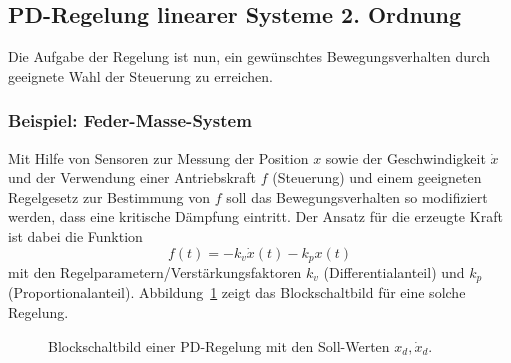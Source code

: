 		\subsection{PD-Regelung linearer Systeme 2. Ordnung} %
			Die Aufgabe der Regelung ist nun, ein gewünschtes Bewegungsverhalten durch geeignete Wahl der Steuerung zu erreichen.

			\subsubsection{Beispiel: Feder-Masse-System} %
				Mit Hilfe von Sensoren zur Messung der Position \( x \) sowie der Geschwindigkeit \( \dot{x} \) und der Verwendung einer Antriebskraft \(f\) (Steuerung) und einem geeigneten Regelgesetz zur Bestimmung von \(f\) soll das Bewegungsverhalten so modifiziert werden, dass eine kritische Dämpfung eintritt. Der Ansatz für die erzeugte Kraft ist dabei die Funktion
				\begin{equation*}
					f(t) = -k_v \dot{x}(t) - k_p x(t)
				\end{equation*}
				mit den Regelparametern/Verstärkungsfaktoren \( k_v \) (Differentialanteil) und \( k_p \) (Proportionalanteil). Abbildung~\ref{fig:pdcontrol} zeigt das Blockschaltbild für eine solche Regelung.
				
				\begin{figure}
					\centering
					\caption{Blockschaltbild einer PD-Regelung mit den Soll-Werten \( x_d, \dot{x}_d \).}
					\label{fig:pdcontrol}
				\end{figure}
			
